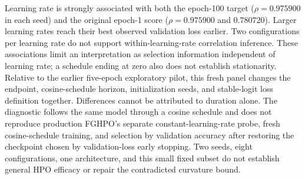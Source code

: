 Learning rate is strongly associated with both the epoch-100 target ($\rho=0.975900$ in each seed) and the original epoch-1 score ($\rho=0.975900$ and $0.780720$). Larger learning rates reach their best observed validation loss earlier. Two configurations per learning rate do not support within-learning-rate correlation inference. These associations limit an interpretation as selection information independent of learning rate; a schedule ending at zero also does not establish stationarity. Relative to the earlier five-epoch exploratory pilot, this fresh panel changes the endpoint, cosine-schedule horizon, initialization seeds, and stable-logit loss definition together. Differences cannot be attributed to duration alone. The diagnostic follows the same model through a cosine schedule and does not reproduce production FGHPO's separate constant-learning-rate probe, fresh cosine-schedule training, and selection by validation accuracy after restoring the checkpoint chosen by validation-loss early stopping. Two seeds, eight configurations, one architecture, and this small fixed subset do not establish general HPO efficacy or repair the contradicted curvature bound.

